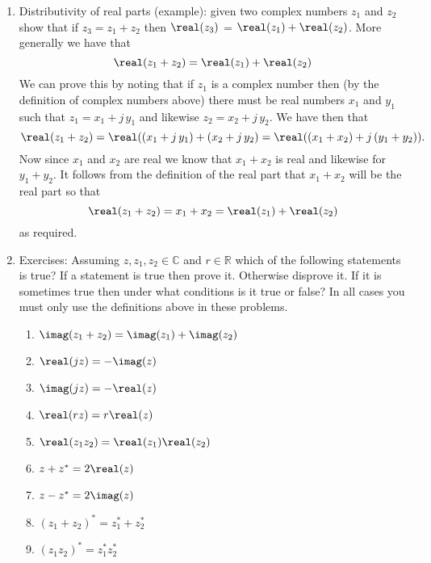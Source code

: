 {\begin{enumerate}
          Given $x=2$ and $y=1+j$ as above, is $z^*$ equal to $x-j\,y$?
      \item Distributivity of real parts (example): given two complex numbers
          $z_1$ and $z_2$ show that if $z_3=z_1+z_2$ then $\real(z_3)$ =
          $\real(z_1) + \real(z_2)$.  More generally we have that
          \[
              \real(z_1+z_2) = \real(z_1) + \real(z_2)
          \]
          We can prove this by noting that if $z_1$ is a complex number then
          (by the definition of complex numbers above) there must be real
          numbers $x_1$ and $y_1$ such that $z_1 = x_1 + j\,y_1$ and likewise
          $z_2 = x_2+j\,y_2$. We have then that
          \[
              \real(z_1+z_2) = \real((x_1 + j\,y_1) + (x_2 + j\,y_2)
                             = \real((x_1 + x_2) + j\,(y_1 + y_2)).
          \]
          Now since $x_1$ and $x_2$ are real we know that $x_1 + x_2$ is real
          and likewise for $y_1+y_2$. It follows from the definition of the
          real part that $x_1+x_2$ will be the real part so that
          \[
              \real(z_1+z_2) = x_1 + x_2 = \real(z_1) + \real(z_2)
          \]
          as required.
      \item Exercises: Assuming $z,z_1,z_2\in\mathbb{C}$ and $r\in\mathbb{R}$
          which of the following statements is true? If a statement is true
          then prove it. Otherwise disprove it. If it is sometimes true then
          under what conditions is it true or false? In all cases you must
          only use the definitions above in these problems.
          \begin{enumerate}
              \item $\imag(z_1 + z_2) = \imag(z_1) + \imag(z_2)$
              \item $\real(jz) = - \imag(z)$
              \item $\imag(jz) = - \real(z)$
              \item $\real(rz) = r\real(z)$
              \item $\real(z_1 z_2) = \real(z_1) \real(z_2)$
              \item $z + z^* = 2\real(z)$
              \item $z - z^* = 2\imag(z)$
              \item $(z_1 + z_2)^* = z_1^* + z_2^*$
              \item $(z_1 z_2)^* = z_1^* z_2^*$
          \end{enumerate}
  \end{enumerate}
}

